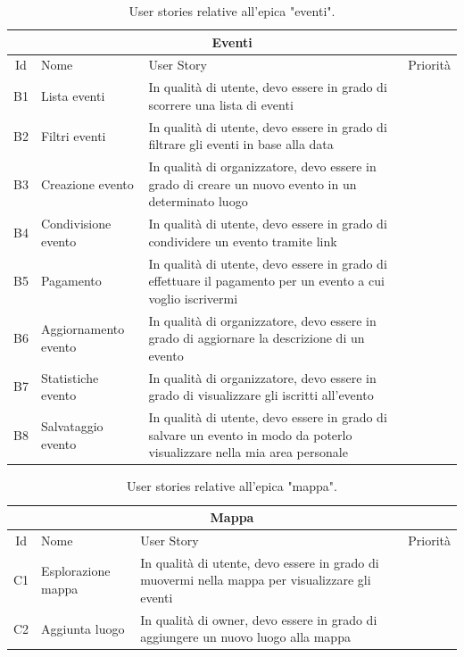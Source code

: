 \documentclass[9pt]{extarticle}
\begin{document}
\begin{table}[!htb]
	\centering
	\begin{tabular}{clp{7cm}l} %
		\toprule
		\multicolumn{4}{c}{\textbf{Eventi}}\\ \midrule
		Id & Nome & User Story & Priorità \\ \midrule
		B1  & Lista eventi            & In qualità di utente, devo essere in grado di scorrere una lista di eventi                                               &  \\
		B2  & Filtri eventi           & In qualità di utente, devo essere in grado di filtrare gli eventi in base alla data                                      &  \\
		B3  & Creazione evento        & In qualità di organizzatore, devo essere in grado di creare un nuovo evento in un determinato luogo                      &  \\
		B4  & Condivisione evento     & In qualità di utente, devo essere in grado di condividere un evento tramite link                                         &  \\
		B5  & Pagamento               & In qualità di utente, devo essere in grado di effettuare il pagamento per un evento a cui voglio iscrivermi              & \\
		B6  & Aggiornamento evento    & In qualità di organizzatore, devo essere in grado di aggiornare la descrizione di un evento                              & \\
		B7  & Statistiche evento      & In qualità di organizzatore, devo essere in grado di visualizzare gli iscritti all'evento                                & \\
		B8  & Salvataggio evento      & In qualità di utente, devo essere in grado di salvare un evento in modo da poterlo visualizzare nella mia area personale & \\
		\bottomrule
	\end{tabular}
	\caption{User stories relative all'epica "eventi".}
	\label{tab:eventi}
\end{table}


\begin{table}[!htb]
	\centering
	\begin{tabular}{clp{7cm}l} %
		\toprule
		\multicolumn{4}{c}{\textbf{Mappa}}\\ \midrule
		Id & Nome & User Story & Priorità \\ \midrule
		C1  & Esplorazione mappa      & In qualità di utente, devo essere in grado di muovermi nella mappa per visualizzare gli eventi                           &  \\
		C2  & Aggiunta luogo          & In qualità di owner, devo essere in grado di aggiungere un nuovo luogo alla mappa                                        & \\
		\bottomrule
	\end{tabular}
	\caption{User stories relative all'epica "mappa".}
	\label{tab:mappa}
\end{table}
\end{document}
